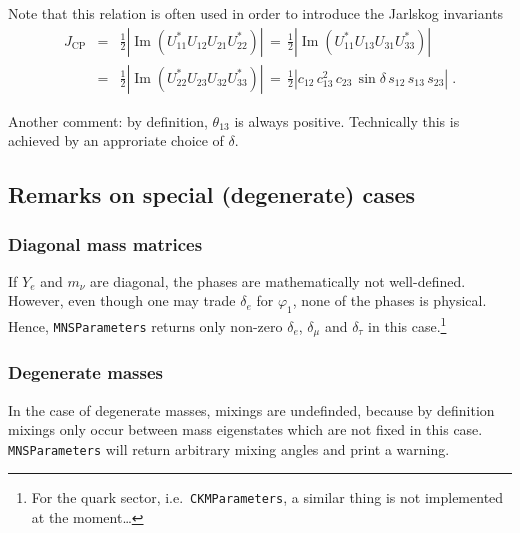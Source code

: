 \documentclass[12pt,a4paper,twoside]{scrartcl}
\newcommand{\function}[1]{{\tt #1}}
\DeclareMathOperator{\im}{Im}
\numberwithin{equation}{section}
\numberwithin{table}{section}
\begin{document}
Note that this relation is often used in order to introduce 
the Jarlskog invariants \cite{Jarlskog:1985ht}
\begin{eqnarray}
 J_\mathrm{CP} 
 & = &
 \frac{1}{2} \left| \im (U_{11}^*U_{12}U_{21}U_{22}^*)\right|
 \,=\, 
 \frac{1}{2} \left| \im (U_{11}^*U_{13}U_{31}U_{33}^*)\right|
 \nonumber\\
 & =  &
 \frac{1}{2} \left| \im (U_{22}^*U_{23}U_{32}U_{33}^*)\right|
 \, = \,
 \frac{1}{2}\left|c_{12}\,c_{13}^2\,
    c_{23}\,\sin \delta \,
    s_{12}\,s_{13}\,
    s_{23}\right|\;.
\end{eqnarray}

Another comment: by definition, $\theta_{13}$ is always positive. Technically
this is achieved by an approriate choice of $\delta$.

\subsection{Remarks on special (degenerate) cases}
\label{sec:SpecialCases}
\subsubsection{Diagonal mass matrices}

If $Y_e$ and $m_\nu$ are diagonal, the phases are mathematically not
well-defined. However, even though one may trade $\delta_e$ for $\varphi_1$,
none of the phases is physical. Hence, \function{MNSParameters} returns only
non-zero $\delta_e$, $\delta_\mu$ and $\delta_\tau$ in this case.\footnote{For
the quark sector, i.e.\ \function{CKMParameters}, a similar thing is not
implemented at the moment\dots}

\subsubsection{Degenerate masses}

In the case of degenerate masses, mixings are undefinded, because by definition
mixings only occur between mass eigenstates which are not fixed in this case.
\function{MNSParameters} will return arbitrary mixing angles and print a
warning.
\end{document}
